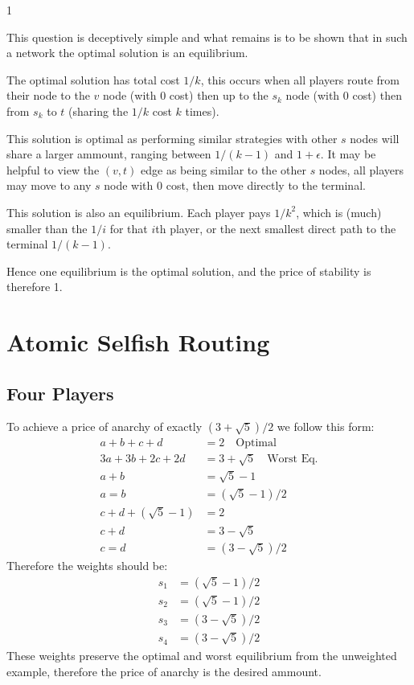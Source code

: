 \documentclass{article}
\begin{document}
1

This question is deceptively simple and what remains is to be shown that in such a network the optimal solution is an equilibrium.

The optimal solution has total cost $1/k$, this occurs when all players route from their node to the $v$ node (with 0 cost) then up to the $s_k$ node (with 0 cost) then from $s_k$ to $t$ (sharing the $1/k$ cost $k$ times).

This solution is optimal as performing similar strategies with other $s$ nodes will share a larger ammount, ranging between $1/(k-1)$ and $1+\epsilon$.
It may be helpful to view the $(v,t)$ edge as being similar to the other $s$ nodes, all players may move to any $s$ node with 0 cost, then move directly to the terminal.

This solution is also an equilibrium.
Each player pays $1/{k^2}$, which is (much) smaller than the $1/i$ for that $i$th player, or the next smallest direct path to the terminal $1/(k-1)$.

Hence one equilibrium is the optimal solution, and the price of stability is therefore 1.

\section {Atomic Selfish Routing}

\subsection{Four Players}

To achieve a price of anarchy of exactly $(3 + \sqrt{5})/2$ we follow this form:
\begin{align}
	\nonumber a + b + c + d & = 2 \quad \mbox{Optimal} \\
	\nonumber 3a + 3b + 2c + 2d & = 3 + \sqrt{5} \quad \mbox{Worst Eq.} \\
	\nonumber a + b & = \sqrt{5} - 1 \\
	\nonumber a = b & = (\sqrt{5}-1)/2 \\
	\nonumber c + d + (\sqrt{5} - 1) & = 2 \\
	\nonumber c + d & = 3 - \sqrt{5} \\
	\nonumber c = d & =(3 - \sqrt{5})/2
\end{align}
\noindent Therefore the weights should be:
\begin{align}
	\nonumber s_1 & = (\sqrt{5}-1)/2 \\
	\nonumber s_2 & = (\sqrt{5}-1)/2 \\
	\nonumber s_3 & = (3 - \sqrt{5})/2 \\
	\nonumber s_4 & = (3 - \sqrt{5})/2
\end{align}
\noindent These weights preserve the optimal and worst equilibrium from the unweighted example, therefore the price of anarchy is the desired ammount.
\end{document}
